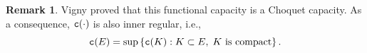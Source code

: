 \documentclass{amsart}
\newcommand{\wt}[1]{\widetilde{#1}}
\newcommand{\tc}{{\tt c}}
\newcommand{\Om}{\Omega}
\newcommand{\cali}[1]{\mathscr{#1}}
\newcommand{\Kc}{\cali{K}}
\newtheorem{thm}{Theorem}
\theoremstyle{definition}
\newtheorem{remark}[thm]{Remark}
\numberwithin{thm}{section}
\numberwithin{equation}{section}
\renewcommand{\[}{\begin{equation}}
\renewcommand{\]}{\end{equation}}
\begin{document}

\begin{remark}
 Vigny \cite[Theoerem~30]{Vigny} proved that  this functional capacity is a Choquet capacity.
As a consequence, $\tc (\cdot)$ is also inner regular, i.e.,
\[\notag\label{eq:inner-reg}
	\tc(E)= \sup\left\{ \tc(K) : K \subset E, \; K\text{ is compact}\right\}.
\]
\end{remark}
\end{document}
